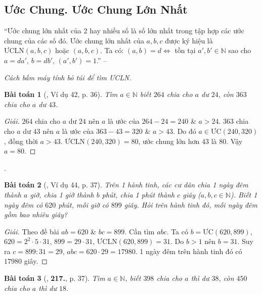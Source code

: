\documentclass{article}
\numberwithin{equation}{section}
\newtheorem{baitoan}{Bài toán}[section]
\begin{document}

\subsection{Ước Chung. Ước Chung Lớn Nhất}
``Ước chung lớn nhất của 2 hay nhiều số là số lớn nhất trong tập hợp các ước chung của các số đó. Ước chung lớn nhất của $a,b,c$ được ký hiệu là $\mbox{ƯCLN}(a,b,c)$ hoặc $(a,b,c)$. Ta có: $(a,b) = d\Leftrightarrow$ tồn tại $a',b'\in\mathbb{N}$ sao cho $a = da'$, $b = db'$, $(a',b') = 1$.'' -- \cite[\S9, p. 36]{Binh_Toan_6_tap_1}

\textit{Cách bấm máy tính bỏ túi để tìm ƯCLN.}

\begin{baitoan}[\cite{Binh_Toan_6_tap_1}, Ví dụ 42, p. 36]
	Tìm $a\in\mathbb{N}$ biết $264$ chia cho $a$ dư $24$, còn $363$ chia cho $a$ dư $43$.
\end{baitoan}

\begin{proof}[Giải]
	$264$ chia cho $a$ dư $24$ nên $a$ là ước của $264 - 24 = 240$ \& $a > 24$. $363$ chia cho $a$ dư $43$ nên $a$ là ước của $363 - 43 = 320$ \& $a > 43$. Do đó $a\in\mbox{ƯC}(240,320)$, đồng thời $a > 43$. $\mbox{ƯCLN}(240,320) = 80$, ước chung lớn hơn $43$ là $80$. Vậy $a = 80$.
\end{proof}
\cite[Ví dụ 43, p. 37]{Binh_Toan_6_tap_1}.

\begin{baitoan}[\cite{Binh_Toan_6_tap_1}, Ví dụ 44, p. 37]
	Trên 1 hành tinh, các cư dân chia 1 ngày đêm thành $a$ giờ, chia 1 giờ thành $b$ phút, chia 1 phút thành $c$ giây ($a,b,c\in\mathbb{N}$). Biết 1 ngày đêm có $620$ phút, mỗi giờ có $899$ giây. Hỏi trên hành tinh đó, mỗi ngày đêm gồm bao nhiêu giây?
\end{baitoan}

\begin{proof}[Giải]
	Theo đề bài $ab = 620$ \& $bc = 899$. Cần tìm $abc$. Ta có $b = \mbox{ƯC}(620,899)$, $620 = 2^2\cdot 5\cdot 31$, $899 = 29\cdot 31$, $\mbox{ƯCLN}(620,899) = 31$. Do $b > 1$ nên $b = 31$. Suy ra $c = 899:31 = 29$, $abc = 620\cdot 29 = 17980$. 1 ngày đêm trên hành tinh đó có $17980$ giây.
\end{proof}

\begin{baitoan}[\cite{Binh_Toan_6_tap_1}, \textbf{217.}, p. 37]
	Tìm $a\in\mathbb{N}$, biết $398$ chia cho $a$ thì dư $38$, còn $450$ chia cho $a$ thì dư $18$.
\end{baitoan}
\end{document}
